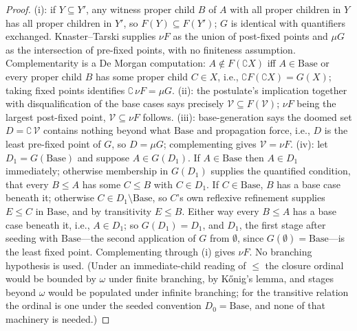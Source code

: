 \begin{proof}
(i): if $Y \subseteq Y'$, any witness proper child $B$ of $A$ with all proper children in $Y$ has all proper children in $Y'$, so $F(Y) \subseteq F(Y')$; $G$ is identical with quantifiers exchanged. Knaster--Tarski \cite{tarski1955lattice} supplies $\nu F$ as the union of post-fixed points and $\mu G$ as the intersection of pre-fixed points, with no finiteness assumption. Complementarity is a De Morgan computation: $A \notin F(\complement X)$ iff $A \in \mathrm{Base}$ or every proper child $B$ has some proper child $C \in X$, i.e., $\complement F(\complement X) = G(X)$; taking fixed points identifies $\complement\,\nu F = \mu G$. (ii): the postulate's implication together with disqualification of the base cases says precisely $\mathcal{V} \subseteq F(\mathcal{V})$; $\nu F$ being the largest post-fixed point, $\mathcal{V} \subseteq \nu F$ follows. (iii): base-generation says the doomed set $D = \complement\,\mathcal{V}$ contains nothing beyond what $\mathrm{Base}$ and propagation force, i.e., $D$ is the least pre-fixed point of $G$, so $D = \mu G$; complementing gives $\mathcal{V} = \nu F$. (iv): let $D_1 = G(\mathrm{Base})$ and suppose $A \in G(D_1)$. If $A \in \mathrm{Base}$ then $A \in D_1$ immediately; otherwise membership in $G(D_1)$ supplies the quantified condition, that every $B \le A$ has some $C \le B$ with $C \in D_1$. If $C \in \mathrm{Base}$, $B$ has a base case beneath it; otherwise $C \in D_1 \setminus \mathrm{Base}$, so $C$'s own reflexive refinement supplies $E \le C$ in $\mathrm{Base}$, and by transitivity $E \le B$. Either way every $B \le A$ has a base case beneath it, i.e., $A \in D_1$; so $G(D_1) = D_1$, and $D_1$, the first stage after seeding with $\mathrm{Base}$---the second application of $G$ from $\emptyset$, since $G(\emptyset) = \mathrm{Base}$---is the least fixed point. Complementing through (i) gives $\nu F$. No branching hypothesis is used. (Under an immediate-child reading of $\le$ the closure ordinal would be bounded by $\omega$ under finite branching, by K\H{o}nig's lemma, and stages beyond $\omega$ would be populated under infinite branching; for the transitive relation the ordinal is one under the seeded convention $D_0 = \mathrm{Base}$, and none of that machinery is needed.) \end{proof}

